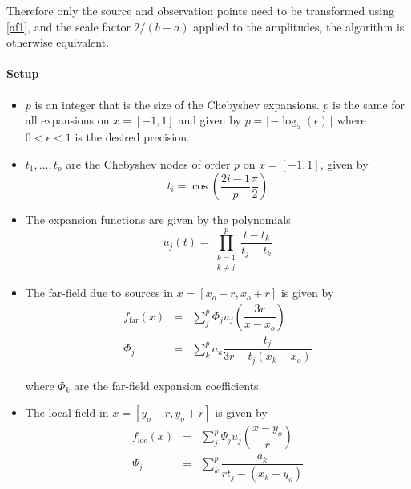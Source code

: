 Therefore only the source and observation points need to be transformed using \eqref{af1}, and the scale factor $2/(b-a)$ applied to the amplitudes, the algorithm is otherwise equivalent.  


\paragraph{Setup}
\begin{itemize}
  \setlength{\itemsep}{1pt}
  \setlength{\parskip}{0pt}
  \setlength{\parsep}{0pt}
\item  $p$ is an integer that is the size of the Chebyshev expansions.  $p$ is the same for all expansions on $x = [-1,1]$ and given by $p = \lceil -\log_5(\epsilon) \rceil$ where $0 < \epsilon < 1$ is the desired precision.  

\item $t_1, ..., t_p$ are the Chebyshev nodes of order $p$ on $x = [-1,1]$, given by
\begin{equation}
t_i = \cos\left(\dfrac{2i-1}{p}\dfrac{\pi}{2}\right) \label{fmm1prepeqfirst}
\end{equation}

\item The expansion functions are given by the polynomials 
\begin{equation}
u_j(t) = \prod_{\substack{k=1 \\ k \neq j}}^p \dfrac{t-t_k}{t_j-t_k} 
\end{equation}

\item The far-field due to sources in $x = [x_o-r,x_o+r]$ is given by
\begin{eqnarray}
f_{\textrm{far}}(x) &=& \sum_j^p \Phi_{j}  u_j\left(\dfrac{3r}{x - x_o}\right) \\
\Phi_{j} &=& \sum_k^p a_k \dfrac{t_j}{3r - t_j(x_k - x_o)} \label{phi1}
\end{eqnarray}

\noindent where $\Phi_{k}$ are the far-field expansion coefficients.

\item The local field in $x = [y_o-r,y_o+r]$ is given by
\begin{eqnarray}
f_{\textrm{loc}}(x) &=& \sum_j^p \Psi_{j}  u_j\left(\dfrac{x - y_o}{r}\right) \label{psi1}\\
\Psi_{j} &=& \sum_k^p  \dfrac{a_k}{rt_j - (x_k - y_o)} 
\end{eqnarray}


\end{itemize}
